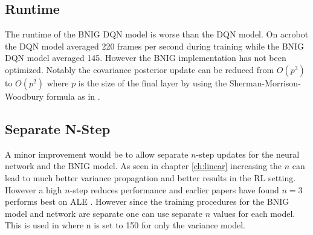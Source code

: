 \subsection{Runtime}

The runtime of the BNIG DQN model is worse than the DQN model. On acrobot the DQN model averaged 220 frames per second during training while the BNIG DQN model averaged 145. However the BNIG implementation has not been optimized. Notably the covariance posterior update can be reduced from $O(p^3)$ to $O(p^2)$ where $p$ is the size of the final layer by using the Sherman-Morrison-Woodbury formula as in \cite{donoghue_2017}. 

\subsection{Separate N-Step}

A minor improvement would be to allow separate $n$-step updates for the neural network and the BNIG model. As seen in chapter \ref{ch:linear} increasing the $n$ can lead to much better variance propagation and better results in the RL setting. However a high $n$-step reduces performance and earlier papers have found $n=3$ performs best on ALE \citep{hessel_2017}. However since the training procedures for the BNIG model and network are separate one can use separate $n$ values for each model. This is used in \cite{donoghue_2017} where n is set to 150 for only the variance model.

\cleardoublepage